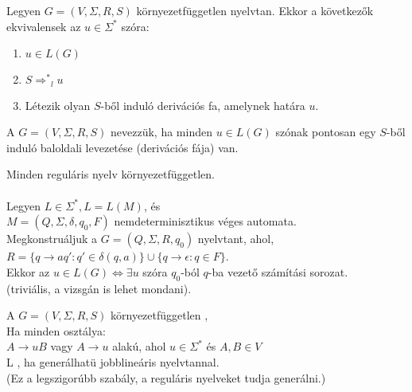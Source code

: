\begin{frame}
\begin{tcolorbox}[title={Tétel: Ekvivalens állítások derivációs fákra}]
Legyen $G = (V, {\Sigma}, R, S)$ környezetfüggetlen nyelvtan. Ekkor a következők ekvivalensek az $u \in {\Sigma}^*$ szóra:\\
\begin{enumerate}
\item $u \in L(G)$
\item $S {{\Rightarrow}^*}_l u$
\item Létezik olyan $S$-ből induló derivációs fa, amelynek határa $u$.
\end{enumerate}
\end{tcolorbox}

\end{frame}

\begin{frame}
\begin{tcolorbox}[title={Egyértelmű nyelvtan}]
A $G = (V, {\Sigma}, R, S)$  nevezzük, ha minden $u \in L(G)$ szónak pontosan egy $S$-ből induló baloldali levezetése (derivációs fája) van.
\end{tcolorbox}
\end{frame}

\begin{frame}
\begin{tcolorbox}[title={Tétel: Reguláris nyelv környezetfüggetlen}]
Minden reguláris nyelv környezetfüggetlen.\\
\tcblower
\msmallskip
\underline{}\\
\mmedskip
Legyen $L \in {\Sigma}^*, L = L(M)$, és\\
$M = (Q, {\Sigma}, {\delta}, q_0, F)$ nemdeterminisztikus véges automata.\\
\mbigskip
Megkonstruáljuk a $G = (Q, {\Sigma}, R, q_0)$ nyelvtant, ahol,\\
$R = \{q \rightarrow aq' : q' \in {\delta}(q, a)\} \cup \{q \rightarrow \epsilon : q \in F \}$.\\
Ekkor az $u \in  L(G) \iff \exists u$ szóra $q_0$-ból $q$-ba vezető számítási sorozat.\\
(triviális, a vizsgán is lehet mondani).
\end{tcolorbox}

\end{frame}

\begin{frame}
\begin{tcolorbox}[title={Jobblineáris nyelvtan, nyelv}]
A $G = (V, {\Sigma}, R, S)$ környezetfüggetlen ,\\
Ha minden osztálya:\\
\mmedskip
$A \rightarrow uB$ vagy $A \rightarrow u$ alakú, ahol $u \in {\Sigma}^*$ és $A, B \in V$\\
\mbigskip
L , ha generálhatü jobblineáris nyelvtannal.\\
\msmallskip
(Ez a legszigorúbb szabály, a reguláris nyelveket tudja generálni.)
\end{tcolorbox}
\end{frame}

